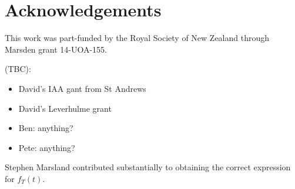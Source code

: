 \documentclass[useAMS, usenatbib, referee]{biom}\usepackage[]{graphicx}\usepackage[]{color}
\begin{document}



\section*{Acknowledgements}
This work was part-funded by the Royal Society of New Zealand through Marsden grant 14-UOA-155.

(TBC):
\begin{itemize}
\item David's IAA gant from St Andrews
\item David's Leverhulme grant
\item Ben: anything?
\item Pete: anything?
\end{itemize}
Stephen Marsland contributed substantially to obtaining the correct expression for $f_T(t)$.




\end{document}
